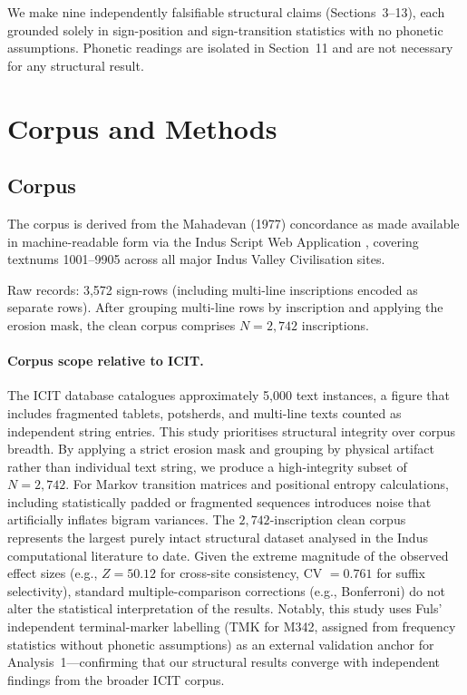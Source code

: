 \documentclass[12pt,letterpaper]{article}
\begin{document}
We make nine independently falsifiable structural claims (Sections~3--13),
each grounded solely in sign-position and sign-transition statistics
with no phonetic assumptions.
Phonetic readings are isolated in Section~11 and are not necessary for
any structural result.

\section{Corpus and Methods}
\label{sec:corpus}

\subsection{Corpus}

The corpus is derived from the Mahadevan (1977) concordance
\citep{Mahadevan1977} as made available in machine-readable form via
the Indus Script Web Application \citep{IndusScript2021},
covering textnums 1001--9905 across all major Indus Valley Civilisation
sites.

Raw records: 3,572 sign-rows (including multi-line inscriptions encoded
as separate rows).
After grouping multi-line rows by inscription and applying the erosion
mask, the clean corpus comprises $N = 2{,}742$ inscriptions.

\paragraph{Corpus scope relative to ICIT.}
The ICIT database \citep{Fuls2010} catalogues approximately 5,000 text
instances, a figure that includes fragmented tablets, potsherds, and
multi-line texts counted as independent string entries.
This study prioritises structural integrity over corpus breadth.
By applying a strict erosion mask and grouping by physical artifact
rather than individual text string, we produce a high-integrity subset
of $N = 2{,}742$.
For Markov transition matrices and positional entropy calculations,
including statistically padded or fragmented sequences introduces noise
that artificially inflates bigram variances.
The $2{,}742$-inscription clean corpus represents the largest purely
intact structural dataset analysed in the Indus computational
literature to date.
Given the extreme magnitude of the observed effect sizes (e.g., $Z = 50.12$ for
cross-site consistency, CV $= 0.761$ for suffix selectivity), standard
multiple-comparison corrections (e.g., Bonferroni) do not alter the statistical
interpretation of the results.
Notably, this study uses Fuls' independent terminal-marker labelling
(TMK for M342, assigned from frequency statistics without phonetic
assumptions) as an external validation anchor for Analysis~1---confirming
that our structural results converge with independent findings from the
broader ICIT corpus.
\end{document}
